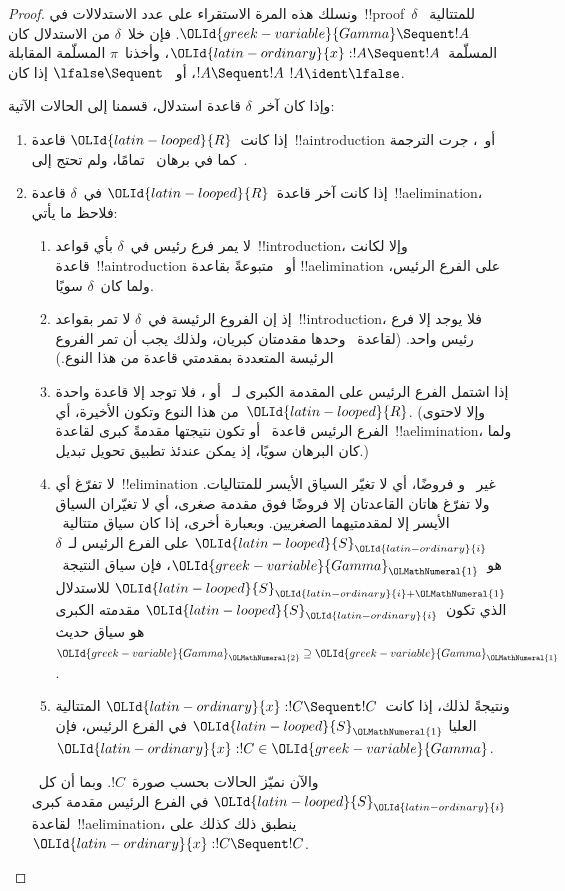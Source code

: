 \documentclass[../../../include/open-logic-section]{subfiles}
\begin{document}
\begin{proof}
ونسلك هذه المرة الاستقراء على عدد الاستدلالات في~!!{proof}~$\delta$
للمتتالية~${\OLId{greek-variable}{Gamma}} \Sequent !A$. فإن خلا~$\delta$ من الاستدلال كان
المسلّمة~${\OLId{latin-ordinary}{x}}:!A \Sequent !A$، وأخذنا~$\pi$ المسلّمة المقابلة
$!A \Sequent !A$، أو~$\lfalse \Sequent \ $ إذا كان
$!A\ident\lfalse$.

وإذا كان آخر~$\delta$ قاعدة استدلال، قسمنا إلى الحالات الآتية:
\begin{enumerate}
  \item إذا كانت~${\OLId{latin-looped}{R}}$ قاعدة~!!a{introduction} أو~\FalseInt، جرت الترجمة
  كما في برهان~ تمامًا، ولم تحتج إلى~\Cut.

  \item إذا كانت آخر قاعدة~${\OLId{latin-looped}{R}}$ في~$\delta$ قاعدة~!!a{elimination}، فلاحظ
  ما يأتي:
  \begin{enumerate}
    \item لا يمر فرع رئيس في~$\delta$ بأي قواعد~!!{introduction}، وإلا
    لكانت قاعدة~!!a{introduction} أو~\FalseInt{} متبوعةً بقاعدة
    !!a{elimination} على الفرع الرئيس، ولما كان~$\delta$ سويًا.
    \item إذ إن الفروع الرئيسة في~$\delta$ لا تمر بقواعد~!!{introduction}،
    فلا يوجد إلا فرع رئيس واحد. (لقاعدة~\Intro{\land} وحدها مقدمتان
    كبريان، ولذلك يجب أن تمر الفروع الرئيسة المتعددة بمقدمتي قاعدة من هذا
    النوع.)
    \item إذا اشتمل الفرع الرئيس على المقدمة الكبرى لـ~\Elim{\lor} أو
    \Elim{\lexists}، فلا توجد إلا قاعدة واحدة من هذا النوع وتكون الأخيرة،
    أي~${\OLId{latin-looped}{R}}$. (وإلا لاحتوى الفرع الرئيس قاعدة~\Elim{\lor} أو
    \Elim{\lexists} تكون نتيجتها مقدمةً كبرى لقاعدة~!!a{elimination}، ولما
    كان البرهان سويًا، إذ يمكن عندئذ تطبيق تحويل تبديل.)
    \item لا تفرّغ أي~!!{elimination} غير~\Elim{\lor} و\Elim{\lexists}
    فروضًا، أي لا تغيّر السياق الأيسر للمتتاليات. ولا تفرّغ هاتان القاعدتان
    إلا فروضًا فوق مقدمة صغرى، أي لا تغيّران السياق الأيسر إلا لمقدمتيهما
    الصغريين. وبعبارة أخرى، إذا كان سياق متتالية~${\OLId{latin-looped}{S}}_{\OLId{latin-ordinary}{i}}$ على الفرع الرئيس
    لـ~$\delta$ هو~${\OLId{greek-variable}{Gamma}}_{\OLMathNumeral{1}}$، فإن سياق النتيجة~${\OLId{latin-looped}{S}}_{{\OLId{latin-ordinary}{i}}+{\OLMathNumeral{1}}}$ للاستدلال الذي
    تكون~${\OLId{latin-looped}{S}}_{\OLId{latin-ordinary}{i}}$ مقدمته الكبرى هو سياق حديث~${\OLId{greek-variable}{Gamma}}_{\OLMathNumeral{2}} \supseteq {\OLId{greek-variable}{Gamma}}_{\OLMathNumeral{1}}$.
    \item ونتيجةً لذلك، إذا كانت~${\OLId{latin-ordinary}{x}}:!C \Sequent !C$ المتتالية العليا
    ${\OLId{latin-looped}{S}}_{\OLMathNumeral{1}}$ في الفرع الرئيس، فإن~${\OLId{latin-ordinary}{x}}:!C \in {\OLId{greek-variable}{Gamma}}$.
  \end{enumerate}
  والآن نميّز الحالات بحسب صورة~$!C$. وبما أن كل~${\OLId{latin-looped}{S}}_{\OLId{latin-ordinary}{i}}$ في الفرع الرئيس
  مقدمة كبرى لقاعدة~!!a{elimination}، ينطبق ذلك كذلك على
  ${\OLId{latin-ordinary}{x}}:!C \Sequent !C$.


\end{enumerate}
\end{proof}
\end{document}
